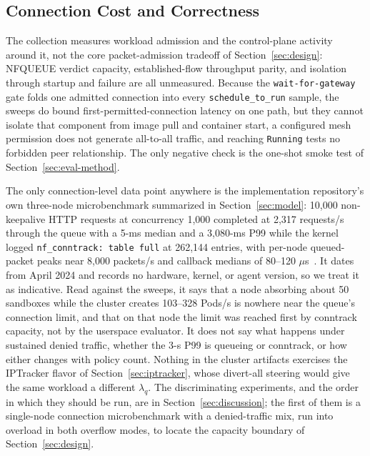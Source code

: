 \subsection{Connection Cost and Correctness}
\label{sec:eval-connection}
The collection measures workload admission and the control-plane
activity around it, not the core packet-admission tradeoff of
Section~\ref{sec:design}: NFQUEUE verdict capacity, established-flow
throughput parity, and isolation through startup and failure are all
unmeasured. Because the \texttt{wait-for-gateway} gate folds one admitted
connection into every \texttt{schedule\_to\_run} sample, the sweeps do
bound first-permitted-connection latency on one path, but they cannot
isolate that component from image pull and container start, a configured
mesh permission does not generate all-to-all traffic, and reaching
\texttt{Running} tests no forbidden peer relationship. The only negative
check is the one-shot smoke test of Section~\ref{sec:eval-method}.

The only connection-level data point anywhere is the implementation
repository's own three-node microbenchmark summarized in
Section~\ref{sec:model}: 10,000 non-keepalive HTTP requests at
concurrency 1,000 completed at 2,317 requests/s through the queue with a
5-ms median and a 3,080-ms P99 while the kernel logged
\texttt{nf\_conntrack: table full} at 262,144 entries, with per-node
queued-packet peaks near 8,000 packets/s and callback medians of
80--120 $\mu$s~\cite{knptesting}. It dates from April 2024 and records no
hardware, kernel, or agent version, so we treat it as indicative. Read
against the sweeps, it says that a node absorbing about 50 sandboxes
while the cluster creates 103--328 Pods/s is nowhere near the queue's
connection limit, and that on that node the limit was reached first by
conntrack capacity, not by the userspace evaluator. It does not say what
happens under sustained denied traffic, whether the 3-s P99 is queueing
or conntrack, or how either changes with policy count. Nothing in the
cluster artifacts exercises the IPTracker flavor of
Section~\ref{sec:iptracker}, whose divert-all steering would give the
same workload a different $\lambda_q$. The discriminating experiments,
and the order in which they should be run, are in
Section~\ref{sec:discussion}; the first of them is a single-node
connection microbenchmark with a denied-traffic mix, run into overload
in both overflow modes, to locate the capacity boundary of
Section~\ref{sec:design}.


